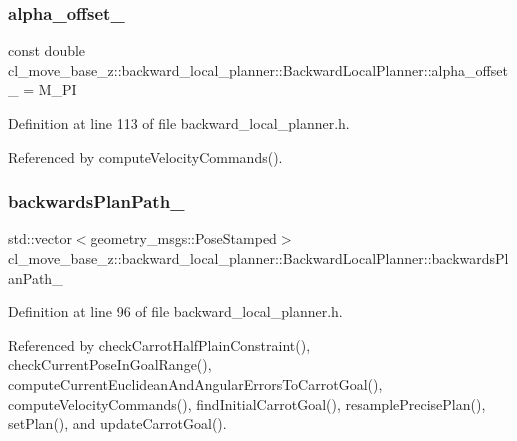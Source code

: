 \subsubsection{\texorpdfstring{alpha\+\_\+offset\+\_\+}{alpha\_offset\_}}
{\footnotesize\ttfamily const double cl\+\_\+move\+\_\+base\+\_\+z\+::backward\+\_\+local\+\_\+planner\+::\+Backward\+Local\+Planner\+::alpha\+\_\+offset\+\_\+ = M\+\_\+\+PI\hspace{0.3cm}{\ttfamily [private]}}



Definition at line 113 of file backward\+\_\+local\+\_\+planner.\+h.



Referenced by compute\+Velocity\+Commands().

\mbox{\label{classcl__move__base__z_1_1backward__local__planner_1_1BackwardLocalPlanner_ad9cde5c85f782cab2ddb4030e3c3f2cf}} 
\subsubsection{\texorpdfstring{backwards\+Plan\+Path\+\_\+}{backwardsPlanPath\_}}
{\footnotesize\ttfamily std\+::vector$<$geometry\+\_\+msgs\+::\+Pose\+Stamped$>$ cl\+\_\+move\+\_\+base\+\_\+z\+::backward\+\_\+local\+\_\+planner\+::\+Backward\+Local\+Planner\+::backwards\+Plan\+Path\+\_\+\hspace{0.3cm}{\ttfamily [private]}}



Definition at line 96 of file backward\+\_\+local\+\_\+planner.\+h.



Referenced by check\+Carrot\+Half\+Plain\+Constraint(), check\+Current\+Pose\+In\+Goal\+Range(), compute\+Current\+Euclidean\+And\+Angular\+Errors\+To\+Carrot\+Goal(), compute\+Velocity\+Commands(), find\+Initial\+Carrot\+Goal(), resample\+Precise\+Plan(), set\+Plan(), and update\+Carrot\+Goal().

